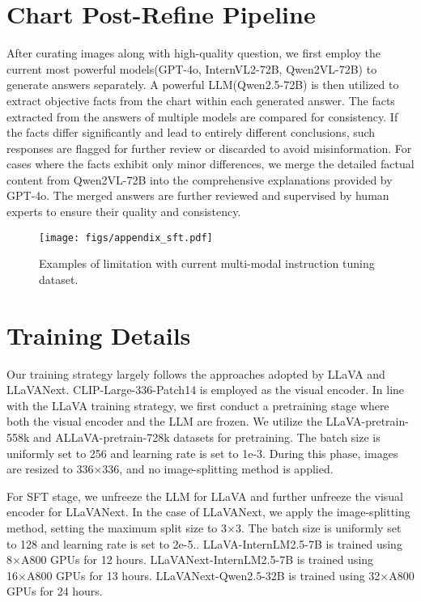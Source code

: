 \section{Chart Post-Refine Pipeline}
\label{appd: chart post}
After curating images along with high-quality question, we first employ the current most powerful models(GPT-4o, InternVL2-72B, Qwen2VL-72B) to generate answers separately. 
A powerful LLM(Qwen2.5-72B) is then utilized to extract objective facts from the chart within each generated answer. 
The facts extracted from the answers of multiple models are compared for consistency. If the facts differ significantly and lead to entirely different conclusions, such responses are flagged for further review or discarded to avoid misinformation.
For cases where the facts exhibit only minor differences, we merge the detailed factual content from Qwen2VL-72B into the comprehensive explanations provided by GPT-4o. 
The merged answers are further reviewed and supervised by human experts to ensure their quality and consistency. 
\begin{figure}[t]
    \centering
    \texttt{[image: figs/appendix\_sft.pdf]}
    \caption{Examples of limitation with current multi-modal instruction tuning dataset.}
    \label{fig:badsft}
\end{figure}
\section{Training Details}
Our training strategy largely follows the approaches adopted by LLaVA and LLaVANext. CLIP-Large-336-Patch14 is employed as the visual encoder. In line with the LLaVA training strategy, we first conduct a pretraining stage where both the visual encoder and the LLM are frozen. 
We utilize the LLaVA-pretrain-558k  and ALLaVA-pretrain-728k  datasets for pretraining. The batch size is uniformly set to 256 and learning rate is set to 1e-3.
During this phase, images are resized to 336×336, and no image-splitting method is applied. 

For SFT stage, we unfreeze the LLM for LLaVA and further unfreeze the visual encoder for LLaVANext. 
In the case of LLaVANext, we apply the image-splitting method, setting the maximum split size to 3×3. The batch size is uniformly set to 128 and learning rate is set to 2e-5.. LLaVA-InternLM2.5-7B  is trained using 8×A800 GPUs for 12 hours. LLaVANext-InternLM2.5-7B  is trained using 16×A800 GPUs for 13 hours. LLaVANext-Qwen2.5-32B  is trained using 32×A800 GPUs for 24 hours.

